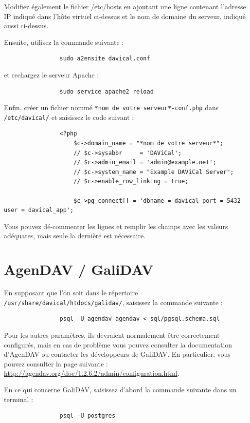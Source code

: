 \documentclass[a4paper, 11pt]{report}
\begin{document}
			Modifiez également le fichier /etc/hosts en ajoutant une ligne contenant l’adresse IP indiqué dans l’hôte virtuel ci-dessus et le nom de domaine du serveur, indiqué aussi ci-dessus.

			Ensuite, utilisez la commande suivante :
			\begin{verbatim}
				sudo a2ensite davical.conf
			\end{verbatim}

			et rechargez le serveur Apache :
			\begin{verbatim}
				sudo service apache2 reload
			\end{verbatim}

			Enfin, créer un fichier nommé \texttt{*nom de votre serveur*-conf.php} dans \texttt{/etc/davical/} et saisissez le code suivant :
			\begin{verbatim}
				<?php
					$c->domain_name = "*nom de votre serveur*";
					// $c->sysabbr     = 'DAViCal';
					// $c->admin_email = 'admin@example.net';
					// $c->system_name = "Example DAViCal Server";
					// $c->enable_row_linking = true;

					$c->pg_connect[] = 'dbname = davical port = 5432 user = davical_app';
			\end{verbatim}

			Vous pouvez dé-commenter les lignes et remplir les champs avec les valeurs adéquates, mais seule la dernière est nécessaire.

		\section{AgenDAV / GaliDAV}
			En supposant que l’on soit dans le répertoire \texttt{/usr/share/davical/htdocs/galidav/}, saisissez la commande suivante :

			\begin{verbatim}
				psql -U agendav agendav < sql/pgsql.schema.sql
			\end{verbatim}
			Pour les autres paramètres, ils devraient normalement être correctement configurés, mais en cas de problème vous pouvez consulter la documentation d’AgenDAV ou contacter les développeurs de GaliDAV. En particulier, vous pouvez consulter la page suivante : \url{http://agendav.org/doc/1.2.6.2/admin/configuration.html}.

			En ce qui concerne GaliDAV, saisissez d’abord la commande suivante dans un terminal :
			\begin{verbatim}
				psql -U postgres
			\end{verbatim}
\end{document}
